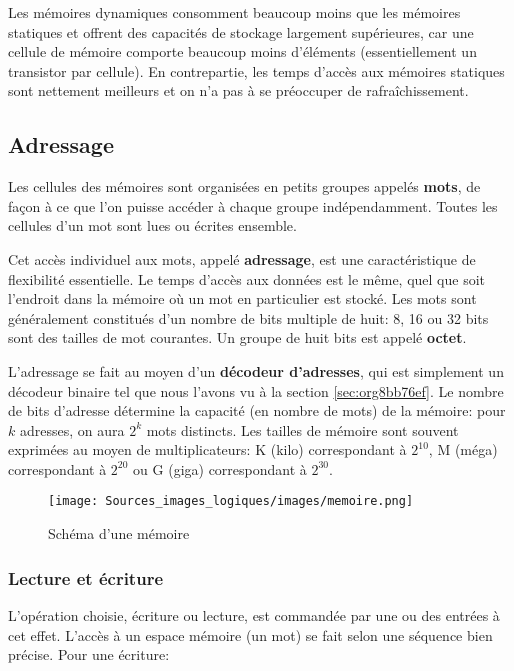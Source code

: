 \documentclass[11pt]{article}
\begin{document}
Les mémoires dynamiques consomment beaucoup moins que les mémoires
statiques et offrent des capacités de stockage largement supérieures,
car une cellule de mémoire comporte beaucoup moins d'éléments
(essentiellement un transistor par cellule). En contrepartie, les
temps d'accès aux mémoires statiques sont nettement meilleurs et on
n'a pas à se préoccuper de rafraîchissement.

\subsection{Adressage}
\label{sec:org42d6119}

Les cellules des mémoires sont organisées en petits groupes appelés
\textbf{mots}, de façon à ce que l'on puisse accéder à chaque groupe
indépendamment. Toutes les cellules d'un mot sont lues ou écrites
ensemble.

Cet accès individuel aux mots, appelé \textbf{adressage}, est une
caractéristique de flexibilité essentielle. Le temps d'accès aux
données est le même, quel que soit l'endroit dans la mémoire où un mot
en particulier est stocké. Les mots sont généralement constitués d'un
nombre de bits multiple de huit: 8, 16 ou 32 bits sont des tailles de
mot courantes. Un groupe de huit bits est appelé \textbf{octet}.

L'adressage se fait au moyen d'un \textbf{décodeur d'adresses}, qui est
simplement un décodeur binaire tel que nous l'avons vu à la section
\ref{sec:org8bb76ef}. Le nombre de bits d'adresse détermine la capacité (en nombre
de mots) de la mémoire: pour \(k\) adresses, on aura \(2^k\) mots
distincts. Les tailles de mémoire sont souvent exprimées au moyen de
multiplicateurs: K (kilo) correspondant à \(2^{10}\), M (méga)
correspondant à \(2^{20}\) ou G (giga) correspondant à \(2^{30}\).


\begin{figure}[htbp]
\centering
\texttt{[image: Sources\_images\_logiques/images/memoire.png]}
\caption{\label{fig:org781bcf6}Schéma d'une mémoire}
\end{figure}

\subsubsection{Lecture et écriture}
\label{sec:orga033017}

L'opération choisie, écriture ou lecture, est commandée par une ou des
entrées à cet effet. L'accès à un espace mémoire (un mot) se fait
selon une séquence bien précise. Pour une écriture:
\end{document}
